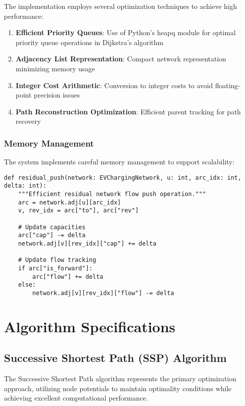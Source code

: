 \documentclass[12pt,a4paper]{article}
\begin{document}
The implementation employs several optimization techniques to achieve high performance:

\begin{enumerate}
\item \textbf{Efficient Priority Queues}: Use of Python's heapq module for optimal priority queue operations in Dijkstra's algorithm
\item \textbf{Adjacency List Representation}: Compact network representation minimizing memory usage
\item \textbf{Integer Cost Arithmetic}: Conversion to integer costs to avoid floating-point precision issues
\item \textbf{Path Reconstruction Optimization}: Efficient parent tracking for path recovery
\end{enumerate}

\subsubsection{Memory Management}

The system implements careful memory management to support scalability:

\begin{lstlisting}[caption=Memory-Efficient Operations]
def residual_push(network: EVChargingNetwork, u: int, arc_idx: int, delta: int):
    """Efficient residual network flow push operation."""
    arc = network.adj[u][arc_idx]
    v, rev_idx = arc["to"], arc["rev"]
    
    # Update capacities
    arc["cap"] -= delta
    network.adj[v][rev_idx]["cap"] += delta
    
    # Update flow tracking
    if arc["is_forward"]:
        arc["flow"] += delta
    else:
        network.adj[v][rev_idx]["flow"] -= delta
\end{lstlisting}

\section{Algorithm Specifications}

\subsection{Successive Shortest Path (SSP) Algorithm}

The Successive Shortest Path algorithm represents the primary optimization approach, utilizing node potentials to maintain optimality conditions while achieving excellent computational performance.
\end{document}
